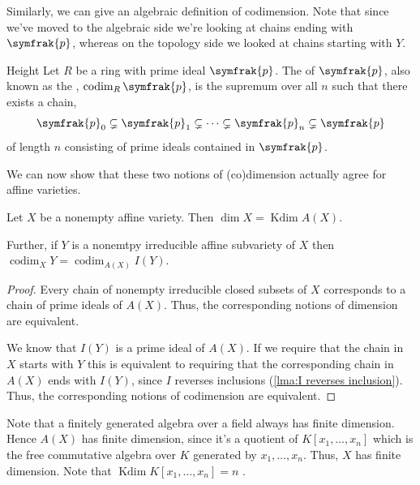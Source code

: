 \documentclass[fleqn]{NotesClass}
\newcommand{\ideal}[1]{\symfrak{#1}}
\DeclareMathOperator{\codim}{codim}
\DeclareMathOperator{\Kdim}{Kdim}
\begin{document}
    Similarly, we can give an algebraic definition of codimension.
    Note that since we've moved to the algebraic side we're looking at chains ending with \(\ideal{p}\), whereas on the topology side we looked at chains starting with \(Y\).
    
    \begin{dfn}{Height}{}
        Let \(R\) be a ring with prime ideal \(\ideal{p}\).
        The  of \(\ideal{p}\), also known as the , \(\codim_R \ideal{p}\), is the supremum over all \(n\) such that there exists a chain,
        \begin{equation}
            \ideal{p}_0 \subsetneq \ideal{p}_1 \subsetneq \dotsb \subsetneq \ideal{p}_n \subsetneq \ideal{p}
        \end{equation}
        of length \(n\) consisting of prime ideals contained in \(\ideal{p}\).
    \end{dfn}
    
    We can now show that these two notions of (co)dimension actually agree for affine varieties.
    
    \begin{lma}{}{}
        Let \(X\) be a nonempty affine variety.
        Then \(\dim X = \Kdim A(X)\).
        
        Further, if \(Y\) is a nonemtpy irreducible affine subvariety of \(X\) then \(\codim_X Y = \codim_{A(X)} I(Y)\).
        \begin{proof}
            Every chain of nonempty irreducible closed subsets of \(X\) corresponds to a chain of prime ideals of \(A(X)\).
            Thus, the corresponding notions of dimension are equivalent.
            
            We know that \(I(Y)\) is a prime ideal of \(A(X)\).
            If we require that the chain in \(X\) starts with \(Y\) this is equivalent to requiring that the corresponding chain in \(A(X)\) ends with \(I(Y)\), since \(I\) reverses inclusions (\cref{lma:I reverses inclusion}).
            Thus, the corresponding notions of codimension are equivalent.
        \end{proof}
    \end{lma}
    
    Note that a finitely generated algebra over a field always has finite dimension.
    Hence \(A(X)\) has finite dimension, since it's a quotient of \(K[x_1, \dotsc, x_n]\) which is the free commutative algebra over \(K\) generated by \(x_1, \dotsc, x_n\).
    Thus, \(X\) has finite dimension.
    Note that \(\Kdim K[x_1, \dotsc, x_n] = n\) \cite[Prop 11.9(a)]{gathmann.comm.alg}.
    
\end{document}
